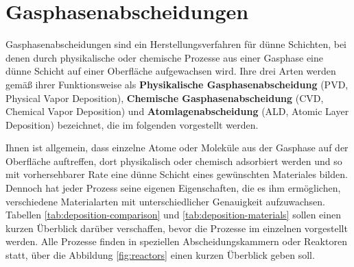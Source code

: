 \section{Gasphasenabscheidungen}
\label{depositions}

Gasphasenabscheidungen sind ein Herstellungsverfahren für dünne Schichten, bei denen durch physikalische oder chemische Prozesse aus einer Gasphase eine dünne Schicht auf einer Oberfläche aufgewachsen wird.
Ihre drei Arten werden gemäß ihrer Funktionsweise als \textbf{Physikalische Gasphasenabscheidung} (PVD, Physical Vapor Deposition), \textbf{Chemische Gasphasenabscheidung} (CVD, Chemical Vapor Deposition) und \textbf{Atomlagenabscheidung} (ALD, Atomic Layer Deposition) bezeichnet, die im folgenden vorgestellt werden.

Ihnen ist allgemein, dass einzelne Atome oder Moleküle aus der Gasphase auf der Oberfläche auftreffen, dort physikalisch oder chemisch adsorbiert werden und so mit vorhersehbarer Rate eine dünne Schicht eines gewünschten Materiales bilden.
Dennoch hat jeder Prozess seine eigenen Eigenschaften, die es ihm ermöglichen, verschiedene Materialarten mit unterschiedlicher Genauigkeit aufzuwachsen.
Tabellen \ref{tab:deposition-comparison} und \ref{tab:deposition-materials} sollen einen kurzen Überblick darüber verschaffen, bevor die Prozesse im einzelnen vorgestellt werden.
Alle Prozesse finden in speziellen Abscheidungskammern oder Reaktoren statt, über die Abbildung \ref{fig:reactors} einen kurzen Überblick geben soll.

